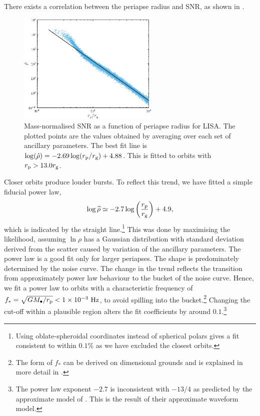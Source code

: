 There exists a correlation between the periapse radius and SNR, as shown in . 
\begin{figure}
  \centering
  \includegraphics[width=0.6\textwidth]{./images/Fig_SNR}
    \caption{Mass-normalised SNR as a function of periapse radius for LISA. The plotted points are the values obtained by averaging over each set of ancillary parameters. The best fit line is $\log(\hat{\rho}) = -2.69\log(r_\mathrm{p}/r_\mathrm{g}) + 4.88$. This is fitted to orbits with $r_\mathrm{p} >  13.0 r_\mathrm{g}$.} %
  \label{fig:SNR}
\end{figure}
Closer orbits produce louder bursts. To reflect this trend, we have fitted a simple fiducial power law,
\begin{equation}
\log\widehat{\rho} \simeq -2.7\log\left(\dfrac{r_\mathrm{p}}{r_\mathrm{g}}\right) + 4.9,
\label{eq:SNR-power-law}
\end{equation}
which is indicated by the straight line.\footnote{Using oblate-spheroidal coordinates instead of spherical polars gives a fit consistent to within $0.1\%$ as we have excluded the closest orbits.} This was done by maximising the likelihood, assuming $\ln \rho$ has a Gaussian distribution with standard deviation derived from the scatter caused by variation of the ancillary parameters. The power law is a good fit only for larger periapses. The shape is predominately determined by the noise curve. The change in the trend reflects the transition from approximately power law behaviour to the bucket of the noise curve. Hence, we fit a power law to orbits with a characteristic frequency of $f_\ast = \sqrt{GM_\bullet/r_\mathrm{p}} < 1 \times 10^{-3}~\mathrm{Hz}$, to avoid spilling into the bucket.\footnote{The form of $f_\ast$ can be derived on dimensional grounds and is explained in more detail in .} Changing the cut-off within a plausible region alters the fit coefficients by around $0.1$.\footnote{The power law exponent $-2.7$ is inconsistent with $-13/4$ as predicted by the approximate model of \citet{Hopman2007}. This is the result of their approximate waveform model.}

